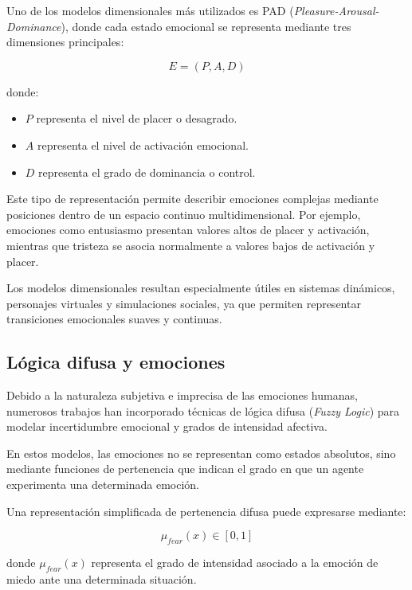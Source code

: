 Uno de los modelos dimensionales más utilizados es PAD (\textit{Pleasure-Arousal-Dominance}), donde cada estado emocional se representa mediante tres dimensiones principales:

\begin{equation}
E = (P, A, D)
\end{equation}

donde:

\begin{itemize}
    \item $P$ representa el nivel de placer o desagrado.
    \item $A$ representa el nivel de activación emocional.
    \item $D$ representa el grado de dominancia o control.
\end{itemize}

Este tipo de representación permite describir emociones complejas mediante posiciones dentro de un espacio continuo multidimensional. Por ejemplo, emociones como entusiasmo presentan valores altos de placer y activación, mientras que tristeza se asocia normalmente a valores bajos de activación y placer.

Los modelos dimensionales resultan especialmente útiles en sistemas dinámicos, personajes virtuales y simulaciones sociales, ya que permiten representar transiciones emocionales suaves y continuas.

\subsection{Lógica difusa y emociones}

Debido a la naturaleza subjetiva e imprecisa de las emociones humanas, numerosos trabajos han incorporado técnicas de lógica difusa (\textit{Fuzzy Logic}) para modelar incertidumbre emocional y grados de intensidad afectiva.

En estos modelos, las emociones no se representan como estados absolutos, sino mediante funciones de pertenencia que indican el grado en que un agente experimenta una determinada emoción.

Una representación simplificada de pertenencia difusa puede expresarse mediante:

\begin{equation}
\mu_{fear}(x) \in [0,1]
\end{equation}

donde $\mu_{fear}(x)$ representa el grado de intensidad asociado a la emoción de miedo ante una determinada situación.


